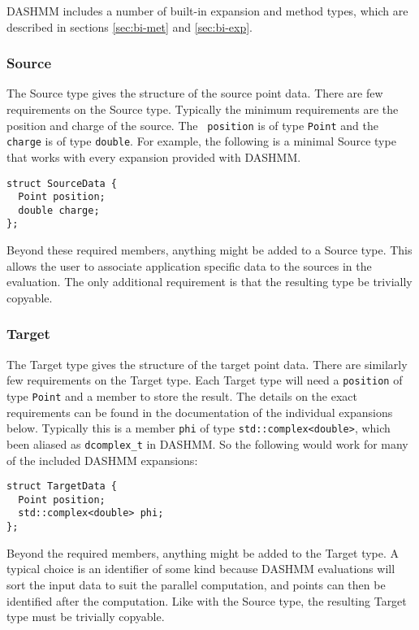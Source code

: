 DASHMM includes a number of built-in expansion and method types, which are
described in sections \ref{sec:bi-met} and \ref{sec:bi-exp}.


\subsubsection{Source}
The Source type gives the structure of the source point data. There
are few requirements on the Source type. Typically the minimum
requirements are the position and charge of the source. The {\tt
  position} is of type {\tt Point} and the {\tt charge} is of type
{\tt double}. For example, the following is a minimal Source type that
works with every expansion provided with DASHMM.

\begin{verbatim}
struct SourceData {
  Point position;
  double charge;
};
\end{verbatim}

\noindent Beyond these required members, anything might be added to a Source
type. This allows the user to associate application specific data to
the sources in the evaluation. The only additional requirement is that
the resulting type be trivially copyable.

\subsubsection{Target}
The Target type gives the structure of the target point data. There
are similarly few requirements on the Target type. Each Target type
will need a {\tt position} of type {\tt Point} and a member to store
the result. The details on the exact requirements can be found in the
documentation of the individual expansions below. Typically this is a
member {\tt phi} of type {\tt std::complex<double>}, which been
  aliased as {\tt dcomplex\_t} in DASHMM. So the following would work
  for many of the included DASHMM expansions:


\begin{verbatim}
struct TargetData {
  Point position;
  std::complex<double> phi;
};
\end{verbatim}

\noindent Beyond the required members, anything might be added to the Target
type. A typical choice is an identifier of some kind because DASHMM
evaluations will sort the input data to suit the parallel computation,
and points can then be identified after the computation. Like with the
Source type, the resulting Target type must be trivially copyable.

